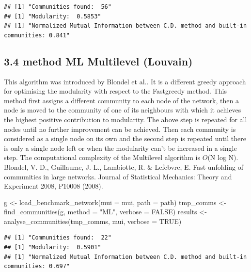 \documentclass[
]{article}
\newenvironment{Shaded}{\begin{snugshade}}{\end{snugshade}}
\newcommand{\AttributeTok}[1]{\textcolor[rgb]{0.77,0.63,0.00}{#1}}
\newcommand{\ConstantTok}[1]{\textcolor[rgb]{0.00,0.00,0.00}{#1}}
\newcommand{\FunctionTok}[1]{\textcolor[rgb]{0.00,0.00,0.00}{#1}}
\newcommand{\NormalTok}[1]{#1}
\newcommand{\OtherTok}[1]{\textcolor[rgb]{0.56,0.35,0.01}{#1}}
\newcommand{\StringTok}[1]{\textcolor[rgb]{0.31,0.60,0.02}{#1}}
\begin{document}
\begin{verbatim}
## [1] "Communities found:  56"
## [1] "Modularity:  0.5853"
## [1] "Normalized Mutual Information between C.D. method and built-in communities: 0.841"
\end{verbatim}

\hypertarget{method-ml-multilevel-louvain}{%
\subsection{3.4 method ML Multilevel
(Louvain)}\label{method-ml-multilevel-louvain}}

This algorithm was introduced by Blondel et al.. It is a different
greedy approach for optimising the modularity with respect to the
Fastgreedy method. This method first assigns a different community to
each node of the network, then a node is moved to the community of one
of its neighbours with which it achieves the highest positive
contribution to modularity. The above step is repeated for all nodes
until no further improvement can be achieved. Then each community is
considered as a single node on its own and the second step is repeated
until there is only a single node left or when the modularity can't be
increased in a single step. The computational complexity of the
Multilevel algorithm is \(O\)(N log N). Blondel, V. D., Guillaume,
J.-L., Lambiotte, R. \& Lefebvre, E. Fast unfolding of communities in
large networks. Journal of Statistical Mechanics: Theory and Experiment
2008, P10008 (2008).

\begin{Shaded}
\begin{Highlighting}[]
\NormalTok{g }\OtherTok{\textless{}{-}} \FunctionTok{load\_benchmark\_network}\NormalTok{(}\AttributeTok{mui =}\NormalTok{ mui, }\AttributeTok{path =}\NormalTok{ path)}
\NormalTok{tmp\_comms }\OtherTok{\textless{}{-}} \FunctionTok{find\_communities}\NormalTok{(g, }\AttributeTok{method =} \StringTok{"ML"}\NormalTok{, }\AttributeTok{verbose =} \ConstantTok{FALSE}\NormalTok{)}
\NormalTok{results }\OtherTok{\textless{}{-}} \FunctionTok{analyse\_communities}\NormalTok{(tmp\_comms, mui, }\AttributeTok{verbose =} \ConstantTok{TRUE}\NormalTok{)}
\end{Highlighting}
\end{Shaded}

\begin{verbatim}
## [1] "Communities found:  22"
## [1] "Modularity:  0.5901"
## [1] "Normalized Mutual Information between C.D. method and built-in communities: 0.697"
\end{verbatim}
\end{document}
